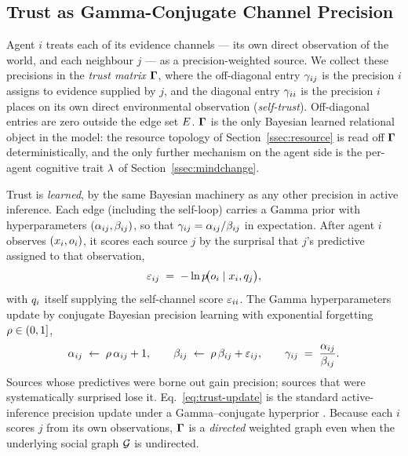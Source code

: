 \subsection{Trust as Gamma-Conjugate Channel Precision}
\label{ssec:trust}

Agent $i$ treats each of its evidence channels --- its own direct
observation of the world, and each neighbour $j$ --- as a
precision-weighted source. We collect these precisions in the
\emph{trust matrix} $\boldsymbol{\Gamma}$, where the off-diagonal entry
$\gamma_{ij}$ is the precision $i$ assigns to evidence supplied by
$j$, and the diagonal entry $\gamma_{ii}$ is the precision $i$ places
on its own direct environmental observation (\emph{self-trust}).
Off-diagonal entries are zero outside the edge set $E$.
$\boldsymbol{\Gamma}$ is the only Bayesian learned relational object in the
model: the resource topology of Section~\ref{ssec:resource} is read
off $\boldsymbol{\Gamma}$ deterministically, and the only further mechanism on
the agent side is the per-agent cognitive trait $\lambda$ of
Section~\ref{ssec:mindchange}.

Trust is \emph{learned}, by the same Bayesian machinery as any other
precision in active inference. Each edge (including the self-loop)
carries a Gamma prior with hyperparameters $(\alpha_{ij},
\beta_{ij})$, so that $\gamma_{ij} = \alpha_{ij}/\beta_{ij}$
in expectation. After agent $i$ observes $(x_i, o_i)$, it scores
each source $j$ by the surprisal that $j$'s predictive assigned to that
observation,
\begin{equation}
\varepsilon_{ij}
\;=\;
-\ln p\!\bigl(o_i \mid x_i, q_j\bigr),
\label{eq:surprisal}
\end{equation}
with $q_i$ itself supplying the self-channel score $\varepsilon_{ii}$.
The Gamma hyperparameters update by conjugate Bayesian precision
learning with exponential forgetting $\rho \in (0, 1]$,
\begin{equation}
\alpha_{ij} \;\leftarrow\; \rho\,\alpha_{ij} + 1,
\qquad
\beta_{ij} \;\leftarrow\; \rho\,\beta_{ij} + \varepsilon_{ij},
\qquad
\gamma_{ij} \;=\; \frac{\alpha_{ij}}{\beta_{ij}}.
\label{eq:trust-update}
\end{equation}
Sources whose predictives were borne out gain precision; sources that
were systematically surprised lose it. Eq.~\eqref{eq:trust-update} is
the standard active-inference precision update under a
Gamma--conjugate hyperprior \citep{mathys2014HGF}. Because each $i$
scores $j$ from its own observations, $\boldsymbol{\Gamma}$ is a \emph{directed}
weighted graph even when the underlying social graph $\mathcal{G}$ is
undirected.

